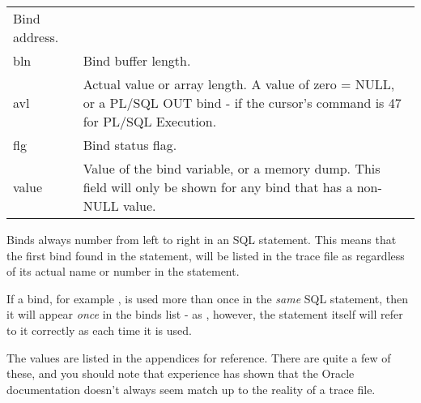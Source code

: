 \begin{longtable}[]{@{}l|l@{}}
\begin{minipage}[t]{0.65\columnwidth}
Bind address.\strut
\end{minipage}\tabularnewline
\begin{minipage}[t]{0.14\columnwidth}\raggedright\strut
bln\strut
\end{minipage} & \begin{minipage}[t]{0.65\columnwidth}\raggedright\strut
Bind buffer length.\strut
\end{minipage}\tabularnewline
\begin{minipage}[t]{0.14\columnwidth}\raggedright\strut
avl\strut
\end{minipage} & \begin{minipage}[t]{0.65\columnwidth}\raggedright\strut
Actual value or array length. A value of zero = NULL, or a PL/SQL OUT bind - if
the cursor's command is 47 for PL/SQL Execution.\strut
\end{minipage}\tabularnewline
\begin{minipage}[t]{0.14\columnwidth}\raggedright\strut
flg\strut
\end{minipage} & \begin{minipage}[t]{0.65\columnwidth}\raggedright\strut
Bind status flag.\strut
\end{minipage}\tabularnewline
\begin{minipage}[t]{0.14\columnwidth}\raggedright\strut
value\strut
\end{minipage} & \begin{minipage}[t]{0.65\columnwidth}\raggedright\strut
Value of the bind variable, or a memory dump. This field will only be
shown for any bind that has a non-NULL value.\strut
\end{minipage}\tabularnewline
\bottomrule
\end{longtable}

Binds always number from left to right in an SQL statement. This means that the first bind found in the statement, will be listed in the trace file as  regardless of its actual name or number in the statement.

If a bind, for example , is used more than once in the \emph{same} SQL statement, then it will appear \emph{once} in the binds list - as , however, the statement itself will refer to it correctly as  each time it is used.

The  values are listed in the appendices for reference. There are quite a few of these, and you should note that experience has shown that the Oracle documentation doesn't always seem match up to the reality of a trace file.

